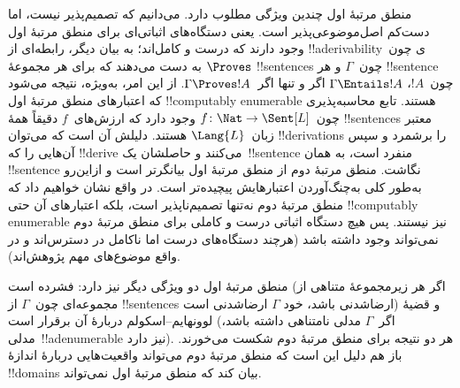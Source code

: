 \documentclass[../../../include/open-logic-section]{subfiles}
\begin{document}


منطق مرتبهٔ اول چندین ویژگی مطلوب دارد. می‌دانیم که تصمیم‌پذیر نیست،
اما دست‌کم اصل‌موضوعی‌پذیر است. یعنی دستگاه‌های اثباتی‌ای برای منطق
مرتبهٔ اول وجود دارند که درست و کامل‌اند؛ به بیان دیگر، رابطه‌ای از
!!a{derivability}ی چون~$\Proves$ به دست می‌دهند که برای هر مجموعهٔ
!!{sentence}s چون~$\Gamma$ و هر !!{sentence} چون~$!A$،
$\Gamma \Entails !A$ اگر و تنها اگر~$\Gamma \Proves !A$. از این امر،
به‌ویژه، نتیجه می‌شود که اعتبارهای منطق مرتبهٔ اول !!{computably
  enumerable} هستند. تابع محاسبه‌پذیری چون~$f\colon \Nat \to
\Sent[L]$ وجود دارد که ارزش‌های~$f$ دقیقاً همهٔ !!{sentence}s معتبر
زبان~$\Lang{L}$ هستند. دلیلش آن است که می‌توان !!{derivation}s را
برشمرد و سپس آن‌هایی را که !!{derive} می‌کنند و حاصلشان یک~!!{sentence}
منفرد است، به همان !!{sentence} نگاشت. منطق مرتبهٔ دوم از منطق مرتبهٔ اول
بیانگرتر است و ازاین‌رو به‌طور کلی به‌چنگ‌آوردن اعتبارهایش پیچیده‌تر
است. در واقع نشان خواهیم داد که منطق مرتبهٔ دوم نه‌تنها تصمیم‌ناپذیر
است، بلکه اعتبارهای آن حتی !!{computably
  enumerable} نیز نیستند. پس
هیچ دستگاه اثباتی درست و کاملی برای منطق مرتبهٔ دوم نمی‌تواند وجود
داشته باشد (هرچند دستگاه‌های درست اما ناکامل در دسترس‌اند و در واقع
موضوع‌های مهم پژوهش‌اند).

منطق مرتبهٔ اول دو ویژگی دیگر نیز دارد: فشرده است (اگر هر زیرمجموعهٔ
متناهی از مجموعه‌ای چون~$\Gamma$ از !!{sentence}s ارضاشدنی باشد، خود
$\Gamma$ ارضاشدنی است) و قضیهٔ لوونهایم--اسکولم دربارهٔ آن برقرار است
(اگر~$\Gamma$ مدلی نامتناهی داشته باشد، مدلی~!!a{denumerable} نیز
دارد). هر دو نتیجه برای منطق مرتبهٔ دوم شکست می‌خورند. باز هم دلیل این
است که منطق مرتبهٔ دوم می‌تواند واقعیت‌هایی دربارهٔ اندازهٔ
!!{domain}s بیان کند که منطق مرتبهٔ اول نمی‌تواند.
\end{document}
